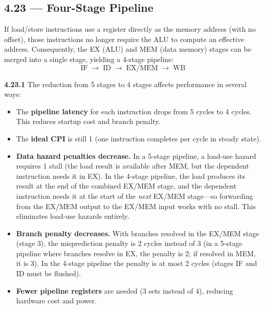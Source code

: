 \subsection*{4.23 --- Four-Stage Pipeline}
\hypertarget{sol-4.23}{}

If load/store instructions use a register directly as the memory address
(with no offset), those instructions no longer require the ALU to compute
an effective address.  Consequently, the EX (ALU) and MEM (data memory)
stages can be merged into a single stage, yielding a 4-stage pipeline:
\[
  \text{IF} \;\to\; \text{ID} \;\to\; \text{EX/MEM} \;\to\; \text{WB}
\]

\medskip\noindent\textbf{4.23.1}
The reduction from 5 stages to 4 stages affects performance in several ways:
\begin{itemize}
  \item The \textbf{pipeline latency} for each instruction drops from 5 cycles
        to 4 cycles.  This reduces startup cost and branch penalty.
  \item The \textbf{ideal CPI} is still 1 (one instruction completes per
        cycle in steady state).
  \item \textbf{Data hazard penalties decrease.}  In a 5-stage pipeline, a
        load-use hazard requires 1 stall (the load result is available after
        MEM, but the dependent instruction needs it in EX).  In the 4-stage
        pipeline, the load produces its result at the end of the combined
        EX/MEM stage, and the dependent instruction needs it at the start of
        the \emph{next} EX/MEM stage---so forwarding from the EX/MEM output to
        the EX/MEM input works with no stall.  This eliminates load-use
        hazards entirely.
  \item \textbf{Branch penalty decreases.}  With branches resolved in the
        EX/MEM stage (stage 3), the misprediction penalty is 2 cycles instead
        of 3 (in a 5-stage pipeline where branches resolve in EX, the penalty
        is 2; if resolved in MEM, it is 3).  In the 4-stage pipeline the
        penalty is at most 2 cycles (stages IF and ID must be flushed).
  \item \textbf{Fewer pipeline registers} are needed (3 sets instead of 4),
        reducing hardware cost and power.
\end{itemize}

